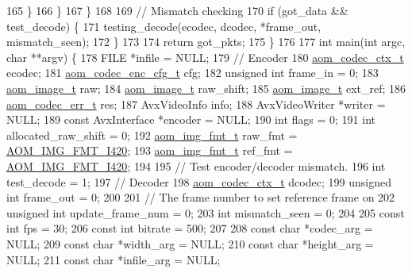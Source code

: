 \begin{DoxyCodeInclude}
{{{{{165       \}
166     \}
167   \}
168 
169   \textcolor{comment}{// Mismatch checking}
170   \textcolor{keywordflow}{if} (got\_data && test\_decode) \{
171     testing\_decode(ecodec, dcodec, *frame\_out, mismatch\_seen);
172   \}
173 
174   \textcolor{keywordflow}{return} got\_pkts;
175 \}
176 
177 \textcolor{keywordtype}{int} main(\textcolor{keywordtype}{int} argc, \textcolor{keywordtype}{char} **argv) \{
178   FILE *infile = NULL;
179   \textcolor{comment}{// Encoder}
180   \hyperlink{structaom__codec__ctx}{aom\_codec\_ctx\_t} ecodec;
181   \hyperlink{structaom__codec__enc__cfg}{aom\_codec\_enc\_cfg\_t} cfg;
182   \textcolor{keywordtype}{unsigned} \textcolor{keywordtype}{int} frame\_in = 0;
183   \hyperlink{structaom__image}{aom\_image\_t} raw;
184   \hyperlink{structaom__image}{aom\_image\_t} raw\_shift;
185   \hyperlink{structaom__image}{aom\_image\_t} ext\_ref;
186   \hyperlink{group__codec_gaaae61e0f8663e6137f1e228757248e7c}{aom\_codec\_err\_t} res;
187   AvxVideoInfo info;
188   AvxVideoWriter *writer = NULL;
189   \textcolor{keyword}{const} AvxInterface *encoder = NULL;
190   \textcolor{keywordtype}{int} flags = 0;
191   \textcolor{keywordtype}{int} allocated\_raw\_shift = 0;
192   \hyperlink{aom__image_8h_ab71efff8c7f49380fad23b93bc2e9bfc}{aom\_img\_fmt\_t} raw\_fmt = \hyperlink{aom__image_8h_a930317c04b4bd0a660bb5e744055523cabd778a3d697463e89d12a1117f417b60}{AOM\_IMG\_FMT\_I420};
193   \hyperlink{aom__image_8h_ab71efff8c7f49380fad23b93bc2e9bfc}{aom\_img\_fmt\_t} ref\_fmt = \hyperlink{aom__image_8h_a930317c04b4bd0a660bb5e744055523cabd778a3d697463e89d12a1117f417b60}{AOM\_IMG\_FMT\_I420};
194 
195   \textcolor{comment}{// Test encoder/decoder mismatch.}
196   \textcolor{keywordtype}{int} test\_decode = 1;
197   \textcolor{comment}{// Decoder}
198   \hyperlink{structaom__codec__ctx}{aom\_codec\_ctx\_t} dcodec;
199   \textcolor{keywordtype}{unsigned} \textcolor{keywordtype}{int} frame\_out = 0;
200 
201   \textcolor{comment}{// The frame number to set reference frame on}
202   \textcolor{keywordtype}{unsigned} \textcolor{keywordtype}{int} update\_frame\_num = 0;
203   \textcolor{keywordtype}{int} mismatch\_seen = 0;
204 
205   \textcolor{keyword}{const} \textcolor{keywordtype}{int} fps = 30;
206   \textcolor{keyword}{const} \textcolor{keywordtype}{int} bitrate = 500;
207 
208   \textcolor{keyword}{const} \textcolor{keywordtype}{char} *codec\_arg = NULL;
209   \textcolor{keyword}{const} \textcolor{keywordtype}{char} *width\_arg = NULL;
210   \textcolor{keyword}{const} \textcolor{keywordtype}{char} *height\_arg = NULL;
211   \textcolor{keyword}{const} \textcolor{keywordtype}{char} *infile\_arg = NULL;
}}}}}
\end{DoxyCodeInclude}
